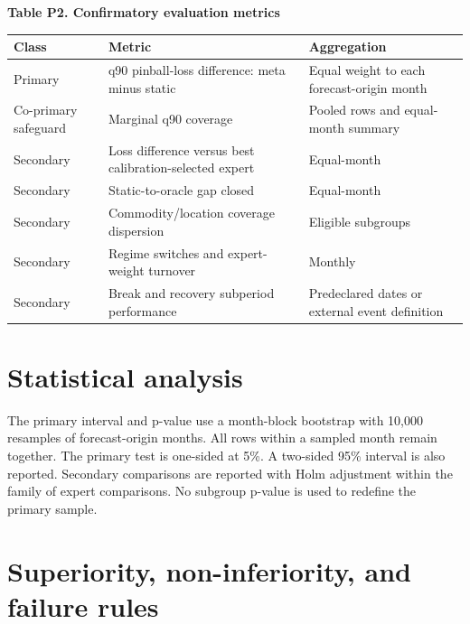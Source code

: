 \documentclass[11pt,a4paper]{article}
\begin{document}
\textbf{Table P2. Confirmatory evaluation metrics}

\begin{longtable}[]{@{}p{}p{}p{}@{}}
\toprule
\textbf{Class} & \textbf{Metric} & \textbf{Aggregation} \\
\midrule
\endhead
\bottomrule
\endlastfoot
Primary & q90 pinball-loss difference: meta minus static & Equal weight to each forecast-origin month \\
Co-primary safeguard & Marginal q90 coverage & Pooled rows and equal-month summary \\
Secondary & Loss difference versus best calibration-selected expert & Equal-month \\
Secondary & Static-to-oracle gap closed & Equal-month \\
Secondary & Commodity/location coverage dispersion & Eligible subgroups \\
Secondary & Regime switches and expert-weight turnover & Monthly \\
Secondary & Break and recovery subperiod performance & Predeclared dates or external event definition \\
\end{longtable}

\section{Statistical analysis}\label{statistical-analysis}

The primary interval and p-value use a month-block bootstrap with 10,000
resamples of forecast-origin months. All rows within a sampled month
remain together. The primary test is one-sided at 5\%. A two-sided 95\%
interval is also reported. Secondary comparisons are reported with Holm
adjustment within the family of expert comparisons. No subgroup p-value
is used to redefine the primary sample.

\section{Superiority, non-inferiority, and failure rules}\label{superiority-non-inferiority-and-failure-rules}
\end{document}
